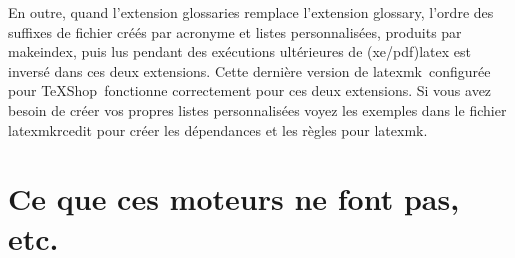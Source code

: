 \documentclass[11pt,french]{article}
\newcommand{\MacTeX}{Mac\kern-.13em\TeX}
\newcommand{\TS}{\textsf{\TeX Shop}}
\newcommand{\latexmk}{\textsf{latexmk}}
\newcommand{\cmd}[1]{\textsf{#1}}
\begin{document}
En outre, quand l'extension \cmd{glossaries} remplace l'extension \cmd{glossary}, l'ordre des suffixes de fichier créés par acronyme et listes personnalisées, produits par \cmd{makeindex}, puis lus pendant des exécutions ultérieures de (\cmd{xe/pdf)latex} est inversé dans ces deux extensions. Cette dernière version de \latexmk\ configurée pour \TS\ fonctionne correctement pour ces deux extensions. Si vous avez besoin de créer vos propres listes personnalisées voyez les exemples dans le fichier \cmd{latexmkrcedit} pour créer les dépendances et les règles pour \latexmk.%

%
%
%
%

\section{Ce que ces moteurs ne font pas, etc.}
\end{document}
